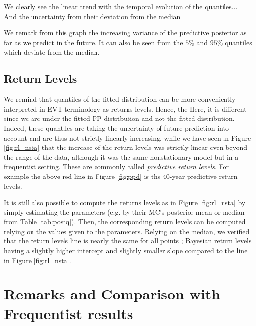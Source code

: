   We clearly see the linear trend with the temporal evolution of the quantiles...
  And the uncertainty from their deviation  from the median
  
  We remark from this graph the increasing variance of the predictive posterior as far as we predict in the future. It can also be seen from the $5\%$ and $95\%$ quantiles which deviate from the median. 
  


\subsection{Return Levels}


We remind that quantiles of the fitted distribution can be more conveniently interpreted in EVT terminology as returns levels. Hence, the  Here, it is different since we are under the fitted PP distribution and not the fitted distribution. Indeed, these quantiles are taking the uncertainty of future prediction into account and are thus not strictly linearly increasing, while we have seen in Figure \ref{fig:rl_nsta} that the increase of the return levels was strictly linear even beyond the range of the data, although it was the same nonstationary model but in a frequentist setting. These are commonly called \emph{predictive return levels}. For example the above red line in Figure \ref{fig:ppd} is the $40$-year predictive return levels.

It is still also possible to compute the returns levels as in Figure \ref{fig:rl_nsta} by simply estimating the parameters (e.g. by their MC's posterior mean or median from Table \ref{tab:postq}). Then, the corresponding return levels can be computed relying on the values given to the parameters. Relying on the median, we verified that the return levels line is nearly the same for all points ; Bayesian return levels having a slightly higher intercept and slightly smaller slope compared to the line in Figure \ref{fig:rl_nsta}. 




\section{Remarks and Comparison with Frequentist results}

